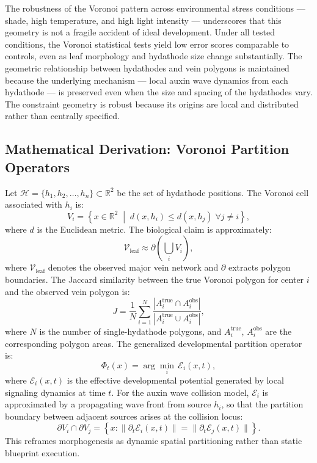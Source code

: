 \documentclass[12pt, a4paper, openany]{book}
\theoremstyle{definition}
\theoremstyle{remark}
\begin{document}
The robustness of the Voronoi pattern across environmental stress conditions — shade, high temperature, and high light intensity — underscores that this geometry is not a fragile accident of ideal development. Under all tested conditions, the Voronoi statistical tests yield low error scores comparable to controls, even as leaf morphology and hydathode size change substantially. The geometric relationship between hydathodes and vein polygons is maintained because the underlying mechanism — local auxin wave dynamics from each hydathode — is preserved even when the size and spacing of the hydathodes vary. The constraint geometry is robust because its origins are local and distributed rather than centrally specified.

\subsection*{Mathematical Derivation: Voronoi Partition Operators}

Let $\mathcal{H} = \{h_1, h_2, \dots, h_n\} \subset \mathbb{R}^2$ be the set of hydathode positions. The Voronoi cell associated with $h_i$ is:
\begin{equation}
V_i = \left\{ x \in \mathbb{R}^2 \;\middle|\; d(x,h_i) \leq d(x,h_j) \;\forall j \neq i \right\},
\end{equation}
where $d$ is the Euclidean metric. The biological claim is approximately:
\begin{equation}
\mathcal{V}_{\text{leaf}} \approx \partial\!\left(\bigcup_i V_i\right),
\end{equation}
where $\mathcal{V}_{\text{leaf}}$ denotes the observed major vein network and $\partial$ extracts polygon boundaries. The Jaccard similarity between the true Voronoi polygon for center $i$ and the observed vein polygon is:
\begin{equation}
J = \frac{1}{N}\sum_{i=1}^{N} \frac{|A_i^{\text{true}} \cap A_i^{\text{obs}}|}{|A_i^{\text{true}} \cup A_i^{\text{obs}}|},
\end{equation}
where $N$ is the number of single-hydathode polygons, and $A_i^{\text{true}}$, $A_i^{\text{obs}}$ are the corresponding polygon areas. The generalized developmental partition operator is:
\begin{equation}
\Phi_t(x) = \arg\min_i \,\mathcal{E}_i(x,t),
\end{equation}
where $\mathcal{E}_i(x,t)$ is the effective developmental potential generated by local signaling dynamics at time $t$. For the auxin wave collision model, $\mathcal{E}_i$ is approximated by a propagating wave front from source $h_i$, so that the partition boundary between adjacent sources arises at the collision locus:
\begin{equation}
\partial V_i \cap \partial V_j = \left\{ x : \|\partial_t \mathcal{E}_i(x,t)\| = \|\partial_t \mathcal{E}_j(x,t)\| \right\}.
\end{equation}
This reframes morphogenesis as dynamic spatial partitioning rather than static blueprint execution.
\end{document}
